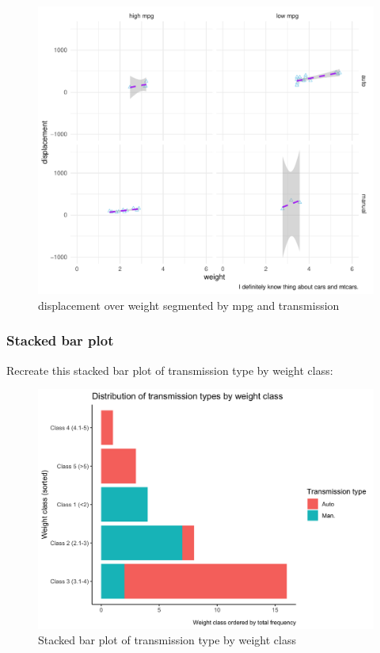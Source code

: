 \documentclass[
  man,
  floatsintext,
  longtable,
  nolmodern,
  notxfonts,
  notimes,
  colorlinks=true,linkcolor=blue,citecolor=blue,urlcolor=blue]{apa7}
\begin{document}
\begin{figure}[H]

\caption{displacement over weight segmented by mpg and transmission}

{\centering \includegraphics{data-visualization_files/figure-pdf/using facet_grid()-1.pdf}

}

\end{figure}%

\subsubsection{Stacked bar plot}\label{stacked-bar-plot}

Recreate this stacked bar plot of transmission type by weight class:

\begin{figure}[H]

\caption{Stacked bar plot of transmission type by weight class}

{\centering \includegraphics{plots/plot6.png}

}

\end{figure}%
\end{document}

